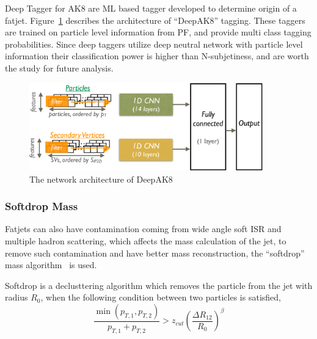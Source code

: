 Deep Tagger for AK8 are \gls{ML} based tagger developed to determine
origin of a fatjet. Figure~\ref{fig:cms-deepAK8-arch}
describes the architecture of ``DeepAK8'' tagging. These taggers are trained on particle level information
from \gls{PF}, and provide multi class tagging probabilities.
Since deep taggers utilize deep neutral network with particle level
information their classification power is higher than N-subjetiness,
and are worth the study for future analysis.

\begin{figure}[!ht]
  \centering
  \includegraphics[width=0.9\textwidth]{figures/CMS_JME_18_002_Figure_009.pdf}
  \caption[The network architecture of DeepAK8]%
  {The network architecture of DeepAK8~\cite{cms-jme-deep-tagger}}%
  \label{fig:cms-deepAK8-arch}
\end{figure}

\subsubsection{
  Softdrop Mass
}

Fatjets can also have contamination coming from wide angle
soft \gls{ISR} and multiple hadron scattering,
which affects the mass calculation of the jet, to remove
such contamination and have better mass reconstruction, the
``softdrop'' mass algorithm~\cite{softdrop-mass-2014} is used.

Softdrop is a declusttering algorithm which removes the particle from the jet
with radius \( R_0 \), when the following condition between two particles is satisfied,
%
\begin{equation}
  \frac{\min(p_{T,1}, p_{T,2})}{p_{T,1} + p_{T,2}} > z_{cut} {\left( \frac{\Delta R_{12}}{R_0} \right)}^{\beta}
\end{equation}

